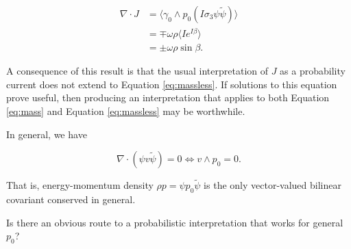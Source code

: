 \documentclass{article}
\begin{document}
  \begin{align}
    \nabla \cdot J &= \langle \gamma_0 \wedge p_0 (I \sigma_3 \psi \widetilde \psi) \rangle \\
                   &= \mp \omega \rho \langle I e^{I \beta} \rangle \\
                   &= \pm \omega \rho \sin \beta.
  \end{align}

  A consequence of this result is that the usual interpretation of $J$ as a probability current does not extend to Equation \ref{eq:massless}. If solutions to this equation prove useful, then producing an interpretation that applies to both Equation \ref{eq:mass} and Equation \ref{eq:massless} may be worthwhile.

  In general, we have

  \begin{equation}
    \nabla \cdot (\psi v \widetilde \psi) = 0 \iff v \wedge p_0 = 0. 
  \end{equation}

  That is, energy-momentum density $\rho p = \psi p_0 \widetilde \psi$ is the only vector-valued bilinear covariant conserved in general.

  Is there an obvious route to a probabilistic interpretation that works for general $p_0$?
\end{document}
